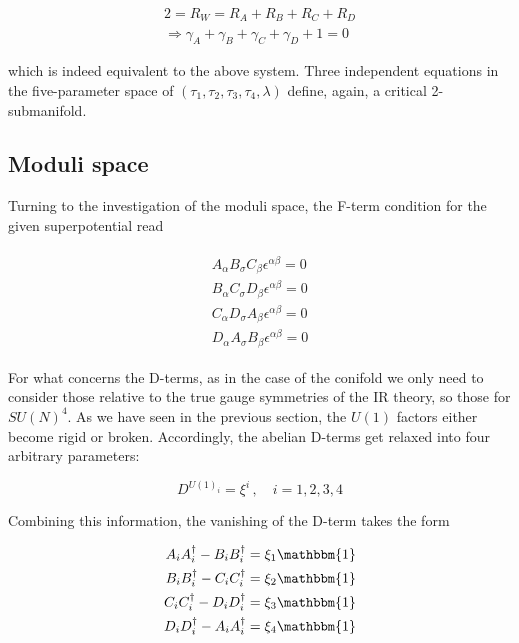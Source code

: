 \begin{equation}
	\begin{split}
	2 = R_W = R_A + R_B + R_C + R_D \\\Rightarrow \gamma_A + \gamma_B + \gamma_C + \gamma_D + 1 = 0
	\label{}
\end{split}
\end{equation}

which is indeed equivalent to the above system. Three independent equations in the five-parameter space of $(\tau_1,\tau_2,\tau_3,\tau_4,\lambda)$ define, again, a critical 2-submanifold.

\subsection{Moduli space}\label{sec:squaresmoduli}

Turning to the investigation of the moduli space, the F-term condition for the given superpotential read

\begin{align}
	\begin{split}
	A_\alpha B_\sigma C_\beta \epsilon^{\alpha\beta} = 0 \\
	B_\alpha C_\sigma D_\beta \epsilon^{\alpha\beta} = 0 \\
	C_\alpha D_\sigma A_\beta \epsilon^{\alpha\beta} = 0 \\
	D_\alpha A_\sigma B_\beta \epsilon^{\alpha\beta} = 0 
	\label{Ftermssquare}
\end{split}
\end{align}

For what concerns the D-terms, as in the case of the conifold we only need to consider those relative to the true gauge symmetries of the IR theory, so those for $SU(N)^4$. As we have seen in the previous section, the $U(1)$ factors either become rigid or broken. Accordingly, the abelian D-terms get relaxed into four arbitrary parameters:

\begin{equation}
	D^{U(1)_i} = \xi^i\,,\quad i = 1,2,3,4
	\label{}
\end{equation}

Combining this information, the vanishing of the D-term takes the form

\begin{align}
	\begin{split}
		A_i A^\dagger_i - B_i B^\dagger_i = \xi_1 \mathbbm{1} \\
		B_i B^\dagger_i - C_i C^\dagger_i = \xi_2 \mathbbm{1} \\
		C_i C^\dagger_i - D_i D^\dagger_i = \xi_3 \mathbbm{1} \\
		D_i D^\dagger_i - A_i A^\dagger_i = \xi_4 \mathbbm{1}
	\end{split}
	\label{Dtermssquare}
\end{align}

